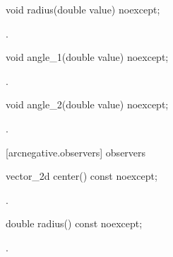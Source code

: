 \begin{itemdecl}
    void radius(double value) noexcept;
\end{itemdecl}
\begin{itemdescr}
	\pnum
	\postconditions
	.
	
\end{itemdescr}

\begin{itemdecl}
    void angle_1(double value) noexcept;
\end{itemdecl}
\begin{itemdescr}
	\pnum
	\postconditions
	.
	
\end{itemdescr}

\begin{itemdecl}
    void angle_2(double value) noexcept;
\end{itemdecl}
\begin{itemdescr}
	\pnum
	\postconditions
	.
	
\end{itemdescr}

 [arcnegative.observers]{ observers}

\begin{itemdecl}
    vector_2d center() const noexcept;
\end{itemdecl}
\begin{itemdescr}
	\pnum
	\returns
	.

\end{itemdescr}

\begin{itemdecl}
    double radius() const noexcept;
\end{itemdecl}
\begin{itemdescr}
	\pnum
	\returns
	.

\end{itemdescr}

